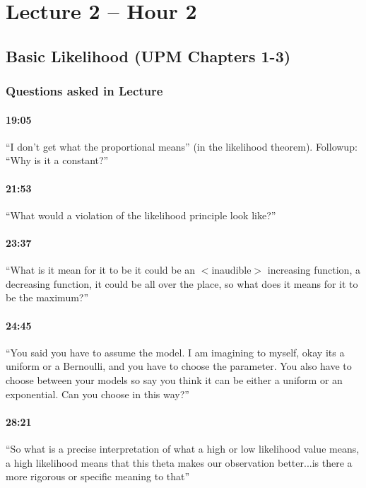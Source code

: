 \documentclass[11pt]{article}
\begin{document}
\section{Lecture 2 -- Hour 2}

\subsection{Basic Likelihood (UPM Chapters 1-3)}

\subsubsection{Questions asked in Lecture}

\paragraph{19:05} ``I don't get what the proportional means'' (in the likelihood theorem). Followup: ``Why is it a constant?''

\paragraph{21:53} ``What would a violation of the likelihood principle look like?''

\paragraph{23:37} ``What is it mean for it to be it could be an $<$inaudible$>$ increasing function, a decreasing function, it could be all over the place, so what does it means for it to be the maximum?''

\paragraph{24:45} ``You said you have to assume the model. I am imagining to myself, okay its a uniform or a Bernoulli, and you have to choose the parameter. You also have to choose between your models so say you think it can be either a uniform or an exponential. Can you choose in this way?''

\paragraph{28:21} ``So what is a precise interpretation of what a high or low likelihood value means, a high likelihood means that this theta makes our observation better...is there a more rigorous or specific meaning to that''
\end{document}
